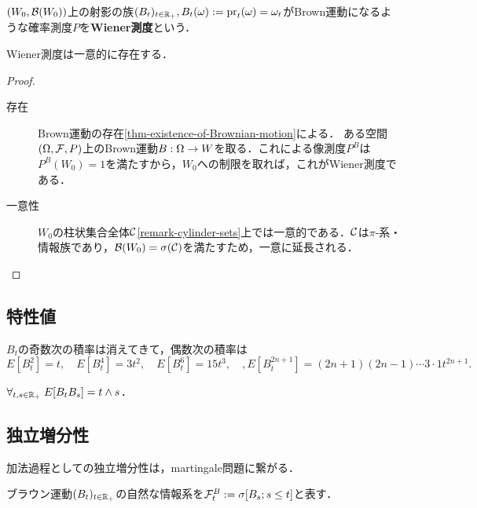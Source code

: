 \documentclass[uplatex,dvipdfmx]{jsreport}
\begin{document}
\begin{definition}
    $(W_0,\mathcal{B}(W_0))$上の射影の族$(B_t)_{t\in\mathbb{R}_+},B_t(\omega):=\mathrm{pr}_t(\omega)=\omega_t$がBrown運動になるような確率測度$P$を\textbf{Wiener測度}という．
\end{definition}

\begin{lemma}
    Wiener測度は一意的に存在する．
\end{lemma}
\begin{proof}\mbox{}
    \begin{description}
        \item[存在] Brown運動の存在\ref{thm-existence-of-Brownian-motion}による．
        ある空間$(\Omega,\mathcal{F},P)$上のBrown運動$B:\Omega\to W$を取る．これによる像測度$P^B$は$P^B(W_0)=1$を満たすから，$W_0$への制限を取れば，これがWiener測度である．
        \item[一意性] $W_0$の柱状集合全体$\mathcal{C}$\ref{remark-cylinder-sets}上では一意的である．$\mathcal{C}$は$\pi$-系・情報族であり，$\mathcal{B}(W_0)=\sigma(\mathcal{C})$を満たすため，一意に延長される．
    \end{description}
\end{proof}

\subsection{特性値}

\begin{lemma}[積率]
    $B_t$の奇数次の積率は消えてきて，偶数次の積率は
    \[E[B_t^2]=t,\quad E[B_t^4]=3t^2,\quad E[B^6_t]=15t^3,\quad,E[B^{2n+1}_t]=(2n+1)(2n-1)\cdots 3\cdot 1t^{2n+1}.\]
\end{lemma}

\begin{lemma}[共分散]
    $\forall_{t,s\in\mathbb{R}_+}\;E[B_tB_s]=t\land s$．
\end{lemma}

\subsection{独立増分性}

\begin{tcolorbox}[colframe=ForestGreen, colback=ForestGreen!10!white,breakable,colbacktitle=ForestGreen!40!white,coltitle=black,fonttitle=\bfseries\sffamily,
title=]
    加法過程としての独立増分性は，martingale問題に繋がる．
\end{tcolorbox}

\begin{notation}
    ブラウン運動$(B_t)_{t\in\mathbb{R}_+}$の自然な情報系を$\mathcal{F}^B_t:=\sigma[B_s;s\le t]$と表す．
\end{notation}
\end{document}
